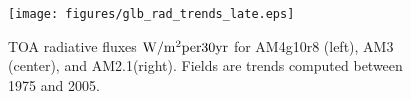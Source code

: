\documentclass[grl]{agutex2015}
\begin{document}
%
\begin{figure}
  \texttt{[image: figures/glb\_rad\_trends\_late.eps]}
  \caption{TOA radiative fluxes $\rm{W/m^2 per 30yr}$ for AM4g10r8 (left), AM3 (center), and AM2.1(right).  Fields are trends computed between 1975 and 2005.}
\end{figure}

\end{document}

